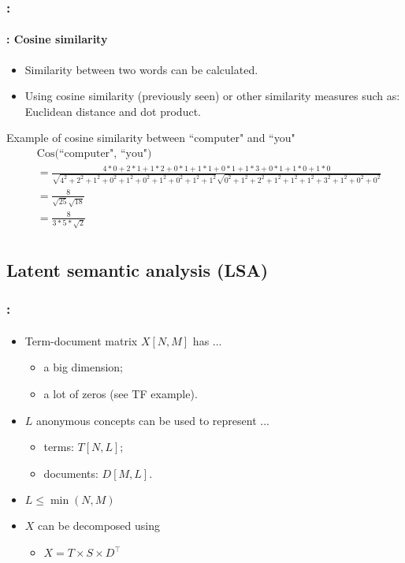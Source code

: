 \documentclass[xcolor=table]{beamer}
\begin{document}
\begin{frame}
	\frametitle{\insertshortsubtitle: \insertsection}
	\framesubtitle{\insertsubsection: Cosine similarity}

	\begin{itemize}
		\item Similarity between two words can be calculated.
		\item Using cosine similarity (previously seen) or other similarity measures such as: Euclidean distance and dot product.
	\end{itemize}
	
	\begin{exampleblock}{Example of cosine similarity between ``computer" and ``you"}
		\fontsize{6}{16}\selectfont\bfseries\boldmath
		\begin{align*}
		& \text{Cos(``computer", ``you")} \\ 
		& = \frac{4*0 + 2*1 + 1*2 + 0*1 + 1*1 + 0*1 + 1*3 + 0*1 + 1*0 + 1*0}{\sqrt{4^2 + 2^2 + 1^2 + 0^2 + 1^2 + 0^2 + 1^2 + 0^2 + 1^2 + 1^2} \sqrt{0^2 + 1^2 + 2^2 + 1^2 + 1^2 + 1^2 + 3^2 + 1^2 + 0^2 + 0^2}}\\
		& = \frac{8}{\sqrt{25}\sqrt{18}}\\
		& = \frac{8}{3*5*\sqrt{2}}\\
		\end{align*}
	\end{exampleblock}

\end{frame}

\subsection{Latent semantic analysis (LSA)}

\begin{frame}
	\frametitle{\insertshortsubtitle: \insertsection}
	\framesubtitle{\insertsubsection}

	\begin{itemize}
		\item Term-document matrix $X[N, M]$ has ...
		\begin{itemize}
			\item a big dimension;
			\item a lot of zeros (see TF example).
		\end{itemize}
		\item $L$ anonymous concepts can be used to represent ...
		\begin{itemize}
			\item terms: $T[N, L]$;
			\item documents: $D[M, L]$.
		\end{itemize}
		\item $L \le \min(N, M)$
		\item $X$ can be decomposed using 
		\begin{itemize}
			\item $X = T \times S \times D^\top$
		\end{itemize}
	\end{itemize}

\end{frame}
\end{document}

